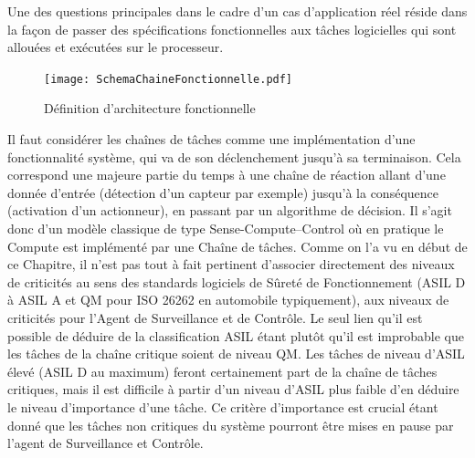 \documentclass[french, a4paper, 11pt, twoside, pdftex]{StyleThese}
\begin{document}
    	
        
		Une des questions principales dans le cadre d'un cas d'application réel réside dans la façon de passer des spécifications fonctionnelles aux tâches logicielles qui sont allouées et exécutées sur le processeur.
		
		\begin{figure}[h!]
			\centering
			\texttt{[image: SchemaChaineFonctionnelle.pdf]}
			\caption{Définition d'architecture fonctionnelle}
			\label{fig:funcArch}
		\end{figure}
	
		Il faut considérer les chaînes de tâches comme une implémentation d'une fonctionnalité système, qui va de son déclenchement jusqu'à sa terminaison. Cela correspond une majeure partie du temps à une chaîne de réaction allant d'une donnée d'entrée (détection d'un capteur par exemple) jusqu'à la conséquence (activation d'un actionneur), en passant par un algorithme de décision. Il s'agit donc d'un modèle classique de type Sense-Compute--Control où en pratique le Compute est implémenté par une Chaîne de tâches.
		Comme on l'a vu en début de ce Chapitre, il n'est pas tout à fait pertinent d'associer directement des niveaux de criticités au sens des standards logiciels de Sûreté de Fonctionnement (ASIL D à ASIL A et QM pour ISO 26262 en automobile typiquement), aux niveaux de criticités pour l'Agent de Surveillance et de Contrôle. Le seul lien qu'il est possible de déduire de la classification ASIL étant plutôt qu'il est improbable que les tâches de la chaîne critique soient de niveau QM. Les tâches de niveau d'ASIL élevé (ASIL D au maximum) feront certainement part de la chaîne de tâches critiques, mais il est difficile à partir d'un niveau d'ASIL plus faible d'en déduire le niveau d'importance d'une tâche. 
		Ce critère d'importance est crucial étant donné que les tâches non critiques du système pourront être mises en pause par l'agent de Surveillance et Contrôle.
		
\end{document}
